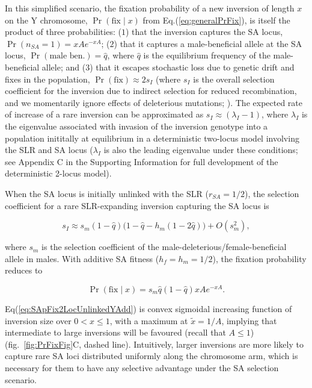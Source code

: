 \documentclass{article}[12pt]
\begin{document}
In this simplified scenario, the fixation probability of a new inversion of length $x$ on the Y chromosome, $\Pr(\text{fix} \mid x)$ from Eq.(\ref{eq:generalPrFix}), is itself the product of three probabilities: ($1$) that the inversion captures the SA locus, $\Pr(n_{SA} = 1) = xA e^{-xA}$; ($2$) that it captures a male-beneficial allele at the SA locus, $\Pr(\text{male~ben.}) = \hat{q}$, where $\hat{q}$ is the equilibrium frequency of the male-beneficial allele; and ($3$) that it escapes stochastic loss due to genetic drift and fixes in the population, $\Pr(\text{fix}) \approx 2 s_I$ (where $s_I$ is the overall selection coefficient for the inversion due to indirect selection for reduced recombination, and we momentarily ignore effects of deleterious mutations; \citealt{Haldane1927}). The expected rate of increase of a rare inversion can be approximated as $s_I \approx (\lambda_I - 1)$, where $\lambda_I$ is the eigenvalue associated with invasion of the inversion genotype into a population inititally at equilibrium in a deterministic two-locus model involving the SLR and SA locus ($\lambda_I$ is also the leading eigenvalue under these conditions; see Appendix C in the Supporting Information for full development of the deterministic 2-locus model). 

When the SA locus is initially unlinked with the SLR ($r_{SA} = 1/2$), the selection coefficient for a rare SLR-expanding inversion capturing the SA locus is
\begin{linenomath*}
\begin{equation}\label{eq:SApFix2LocUnlinked}
	s_I \approx s_m (1 - \hat{q}) \big( 1 - \hat{q} - h_m(1 - 2\hat{q}) \big) + O(s_{m}^{2}),
\end{equation}
\end{linenomath*}

\noindent where $s_m$ is the selection coefficient of the male-deleterious/female-beneficial allele in males. With additive SA fitness ($h_f = h_m = 1/2$), the fixation probability reduces to
\begin{linenomath*}
\begin{equation}\label{eq:SApFix2LocUnlinkedYAdd}
	\Pr(\text{fix} \mid x) = s_m \hat{q} (1 - \hat{q}) xA e^{-xA}.
\end{equation}
\end{linenomath*}

\noindent Eq(\ref{eq:SApFix2LocUnlinkedYAdd}) is convex sigmoidal increasing function of inversion size over $0 < x \leq 1$, with a maximum at $\tilde{x} = 1/A $, implying that intermediate to large inversions will be favoured (recall that $A \leq 1 $) (fig.~\ref{fig:PrFixFig}C, dashed line). Intuitively, larger inversions are more likely to capture rare SA loci distributed uniformly along the chromosome arm, which is necessary for them to have any selective advantage under the SA selection scenario.
\end{document}
